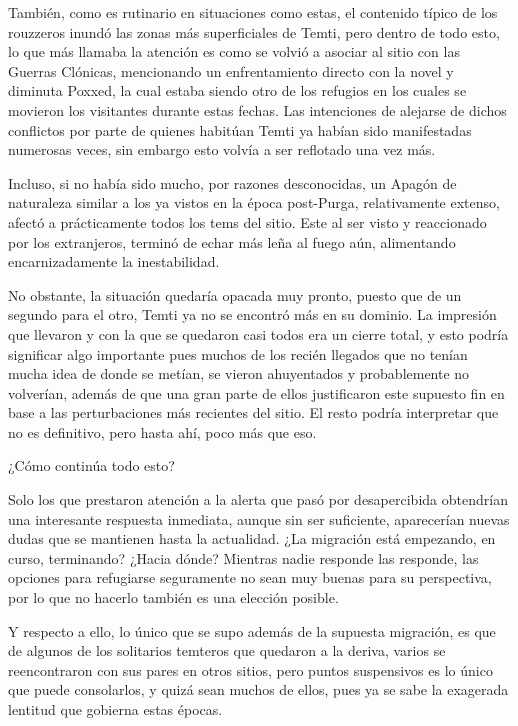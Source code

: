 \documentclass[
]{book}
\begin{document}
También, como es rutinario en situaciones como estas, el contenido típico de los rouzzeros inundó las zonas más superficiales de Temti, pero dentro de todo esto, lo que más llamaba la atención es como se volvió a asociar al sitio con las Guerras Clónicas, mencionando un enfrentamiento directo con la novel y diminuta Poxxed, la cual estaba siendo otro de los refugios en los cuales se movieron los visitantes durante estas fechas. Las intenciones de alejarse de dichos conflictos por parte de quienes habitúan Temti ya habían sido manifestadas numerosas veces, sin embargo esto volvía a ser reflotado una vez más.

Incluso, si no había sido mucho, por razones desconocidas, un Apagón de naturaleza similar a los ya vistos en la época post-Purga, relativamente extenso, afectó a prácticamente todos los tems del sitio. Este al ser visto y reaccionado por los extranjeros, terminó de echar más leña al fuego aún, alimentando encarnizadamente la inestabilidad.

No obstante, la situación quedaría opacada muy pronto, puesto que de un segundo para el otro, Temti ya no se encontró más en su dominio. La impresión que llevaron y con la que se quedaron casi todos era un cierre total, y esto podría significar algo importante pues muchos de los recién llegados que no tenían mucha idea de donde se metían, se vieron ahuyentados y probablemente no volverían, además de que una gran parte de ellos justificaron este supuesto fin en base a las perturbaciones más recientes del sitio. El resto podría interpretar que no es definitivo, pero hasta ahí, poco más que eso.

¿Cómo continúa todo esto?

Solo los que prestaron atención a la alerta que pasó por desapercibida obtendrían una interesante respuesta inmediata, aunque sin ser suficiente, aparecerían nuevas dudas que se mantienen hasta la actualidad. ¿La migración está empezando, en curso, terminando? ¿Hacia dónde? Mientras nadie responde las responde, las opciones para refugiarse seguramente no sean muy buenas para su perspectiva, por lo que no hacerlo también es una elección posible.

Y respecto a ello, lo único que se supo además de la supuesta migración, es que de algunos de los solitarios temteros que quedaron a la deriva, varios se reencontraron con sus pares en otros sitios, pero puntos suspensivos es lo único que puede consolarlos, y quizá sean muchos de ellos, pues ya se sabe la exagerada lentitud que gobierna estas épocas.
\end{document}
